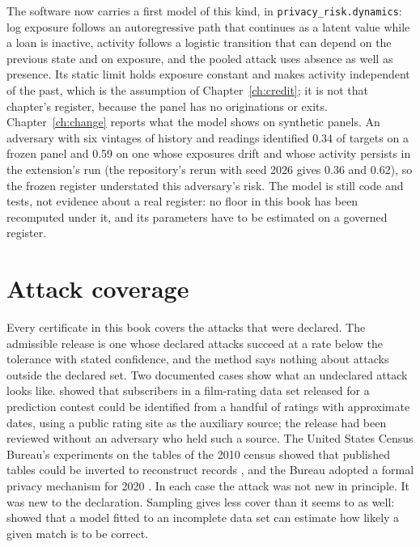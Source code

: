 The software now carries a first model of this kind, in \texttt{privacy\_risk.dynamics}:
log exposure follows an autoregressive path that continues as a latent value while a
loan is inactive, activity follows a logistic transition that can depend on the
previous state and on exposure, and the pooled attack uses absence as well as
presence. Its static limit holds exposure constant and makes activity independent of
the past, which is the assumption of Chapter~\ref{ch:credit}; it is not that chapter's
register, because the panel has no originations or exits. Chapter~\ref{ch:change}
reports what the model shows on synthetic panels. An adversary with six vintages of
history and readings identified 0.34 of targets on a frozen panel and 0.59 on one
whose exposures drift and whose activity persists in the extension's run (the
repository's rerun with seed 2026 gives 0.36 and 0.62), so the frozen register
understated this adversary's risk. The model is still code and tests, not evidence
about a real register: no floor in this book has been recomputed under it, and its
parameters have to be estimated on a governed register.

\section{Attack coverage}

Every certificate in this book covers the attacks that were declared. The admissible
release is one whose declared attacks succeed at a rate below the tolerance with stated
confidence, and the method says nothing about attacks outside the declared set. Two
documented cases show what an undeclared attack looks like. \citet{narayanan2008}
showed that subscribers in a film-rating data set released for a prediction contest
could be identified from a handful of ratings with approximate dates, using a public
rating site as the auxiliary source; the release had been reviewed without an
adversary who held such a source. The United States Census Bureau's experiments on
the tables of the 2010 census showed that published tables could be inverted to
reconstruct records \citep{garfinkel2019}, and the Bureau adopted a formal privacy
mechanism for 2020 \citep{abowd2022}. In each case the attack was not new in
principle. It was new to the declaration. Sampling gives less cover than it seems to as
well: \citet{rocher2019} showed that a model fitted to an incomplete data set can
estimate how likely a given match is to be correct.


